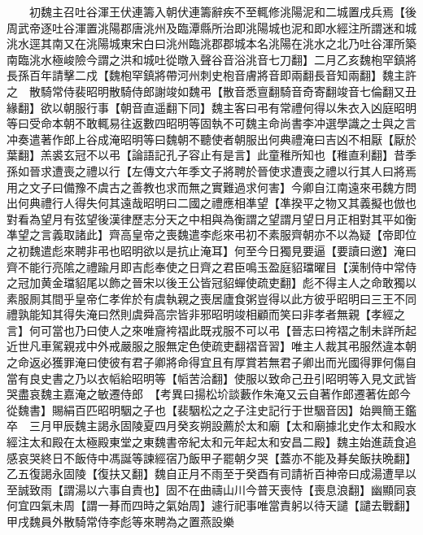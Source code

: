 　　初魏主召吐谷渾王伏連籌入朝伏連籌辭疾不至輒修洮陽泥和二城置戌兵焉【後周武帝逐吐谷渾置洮陽郡唐洮州及臨潭縣所治即洮陽城也泥和即水經注所謂迷和城洮水逕其南又在洮陽城東宋白曰洮州臨洮郡郡城本名洮陽在洮水之北乃吐谷渾所築南臨洮水極峻險今謂之洪和城吐從暾入聲谷音浴洮音七刀翻】二月乙亥魏枹罕鎮將長孫百年請擊二戍【魏枹罕鎮將帶河州刺史枹音膚將音即兩翻長音知兩翻】魏主許之　散騎常侍裴昭明散騎侍郎謝竣如魏弔【散音悉亶翻騎音奇寄翻竣音七倫翻又丑緣翻】欲以朝服行事【朝音直遥翻下同】魏主客曰弔有常禮何得以朱衣入凶庭昭明等曰受命本朝不敢輒易往返數四昭明等固執不可魏主命尚書李冲選學識之士與之言冲奏遣著作郎上谷成淹昭明等曰魏朝不聽使者朝服出何典禮淹曰吉凶不相厭【厭於葉翻】羔裘玄冠不以弔【論語記孔子容止有是言】此童稚所知也【稚直利翻】昔季孫如晉求遭喪之禮以行【左傳文六年季文子將聘於晉使求遭喪之禮以行其人曰將焉用之文子曰備豫不虞古之善教也求而無之實難過求何害】今卿自江南遠來弔魏方問出何典禮行人得失何其遠哉昭明曰二國之禮應相凖望【凖揆平之物又其義擬也倣也對看為望月有弦望後漢律歷志分天之中相與為衡謂之望謂月望日月正相對其平如衡凖望之言義取諸此】齊高皇帝之喪魏遣李彪來弔初不素服齊朝亦不以為疑【帝即位之初魏遣彪來聘非弔也昭明欲以是抗止淹耳】何至今日獨見要逼【要讀曰邀】淹曰齊不能行亮隂之禮踰月即吉彪奉使之日齊之君臣鳴玉盈庭貂璫曜目【漢制侍中常侍之冠加黄金璫貂尾以飾之晉宋以後王公皆冠貂蟬使疏吏翻】彪不得主人之命敢獨以素服厠其間乎皇帝仁孝侔於有虞執親之喪居廬食粥豈得以此方彼乎昭明曰三王不同禮孰能知其得失淹曰然則虞舜高宗皆非邪昭明竣相顧而笑曰非孝者無親【孝經之言】何可當也乃曰使人之來唯齎袴褶此既戎服不可以弔【晉志曰袴褶之制未詳所起近世凡車駕親戎中外戒嚴服之服無定色使疏吏翻褶音習】唯主人裁其弔服然違本朝之命返必獲罪淹曰使彼有君子卿將命得宜且有厚賞若無君子卿出而光國得罪何傷自當有良史書之乃以衣幍給昭明等【幍苦洽翻】使服以致命己丑引昭明等入見文武皆哭盡哀魏主嘉淹之敏遷侍郎　【考異曰揚松圿談藪作朱淹又云自著作郎遷著佐郎今從魏書】賜絹百匹昭明駰之子也【裴駰松之之子注史記行于世駰音因】始興簡王鑑卒　三月甲辰魏主謁永固陵夏四月癸亥朔設薦於太和廟【太和廟據北史作太和殿水經注太和殿在太極殿東堂之東魏書帝紀太和元年起太和安昌二殿】魏主始進蔬食追感哀哭終日不飯侍中馮誕等諫經宿乃飯甲子罷朝夕哭【蓋亦不能及朞矣飯扶晩翻】乙五復謁永固陵【復扶又翻】魏自正月不雨至于癸酉有司請祈百神帝曰成湯遭旱以至誠致雨【謂湯以六事自責也】固不在曲禱山川今普天喪恃【喪息浪翻】幽顯同哀何宜四氣未周【謂一朞而四時之氣始周】遽行祀事唯當責躬以待天譴【譴去戰翻】甲戌魏員外散騎常侍李彪等來聘為之置燕設樂

